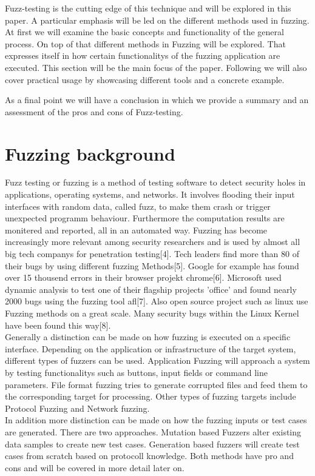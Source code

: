 \documentclass[journal=tosc,final]{iacrtrans}
\begin{document}
Fuzz-testing is the cutting edge of this technique and will be explored in this paper. A particular emphasis will be led on the different methods used in fuzzing. 
At first we will examine the basic concepts and functionality of the general process. On top of that different methods in Fuzzing will be explored. That expresses itself in how certain functionalitys of the fuzzing application are executed. This section will be the main focus of the paper. Following we will also cover practical usage by showcasing different tools and a concrete example. 

As a final point we will have a conclusion in which we provide a summary and an assessment of the pros and cons of Fuzz-testing. 
\newpage
\section{Fuzzing background}
Fuzz testing or fuzzing is a method of testing software to detect security holes in applications, operating systems, and networks. It involves flooding their input interfaces with random data, called fuzz, to make them crash or trigger unexpected programm behaviour. Furthermore the computation results are monitered and reported, all in an automated way. Fuzzing has become increasingly more relevant among security researchers and is used by almost all big tech companys for penetration testing[4]. Tech leaders find more than 80 of their bugs by using different fuzzing Methods[5]. Google for example  has found over 15 thousend errors in their browser projekt chrome[6]. Microsoft used dynamic analysis to test one of their flagship projects 'office' and found nearly 2000 bugs using the fuzzing tool afl[7]. Also open source project such as linux use Fuzzing methods on a great scale. Many security bugs within the Linux Kernel have been found this way[8].\\
Generally a distinction can be made on how fuzzing is executed on a specific interface. Depending on the application or infrastructure of the target system, different types of fuzzers can be used. Application Fuzzing will approach a system by testing functionalitys such as buttons, input fields or command line parameters. File format fuzzing tries to generate corrupted files and feed them to the corresponding target for processing. Other types of fuzzing targets include Protocol Fuzzing and Network fuzzing.\\
In addition more distinction can be made on how the fuzzing inputs or test cases are generated. There are two approaches. Mutation based Fuzzers alter existing data samples to create new test cases.
Generation based fuzzers will create test cases from scratch based on protocoll knowledge. 
Both methods have pro and cons and will be covered in more detail later on.
\end{document}
